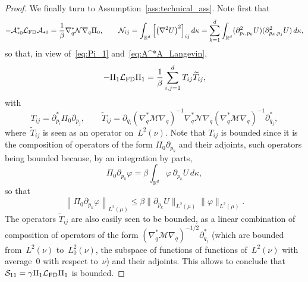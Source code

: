 \documentclass{article}
\newcommand{\cLs}{\mathcal{S}}
\newcommand{\cLa}{\mathcal{A}}
\newcommand{\cLFD}{\mathcal{L}_{\rm FD}}
\newcommand{\R}{\mathbb{R}}
\newcommand{\subplus}{\textnormal{\texttt{+}}}
\renewcommand{\leq}{\leqslant}
\begin{document}
\begin{proof}
We finally turn to Assumption~\ref{ass:technical_ass}. Note first that 
\[
-\cLa_{\subplus 0}^* \cLFD \cLa_{\subplus 0} = \frac{1}{\beta} \nabla_q^* \mathcal{N} \nabla_q \Pi_0, \qquad \mathcal{N}_{ij} = \int_{\R^d} \left[\left(\nabla^2 U\right)^2\right]_{ij} d\kappa = \sum_{k=1}^d \int_{\R^d} (\partial^2_{p_i,p_k} U)(\partial^2_{p_k,p_j} U) \,  d\kappa, 
\]
so that, in view of~\eqref{eq:Pi_1} and~\eqref{eq:A^*A_Langevin},
\[
  -\Pi_1 \cLFD \Pi_1 = \frac{1}{\beta}\sum_{i,j=1}^d T_{ij}\widetilde{T}_{ij},
\]
with
\[
  T_{ij} = \partial_{p_i}^* \Pi_0 \partial_{p_j},
  \qquad
  \widetilde{T}_{ij} = \partial_{q_i} \left(\nabla_q^* \mathcal{M} \nabla_q\right)^{-1}\nabla_q^* \mathcal{N} \nabla_q \left(\nabla_q^* \mathcal{M} \nabla_q\right)^{-1} \partial_{q_j}^*,
  \]
  where~$\widetilde{T}_{ij}$ is seen as an operator on~$L^2(\nu)$. Note that $T_{ij}$ is bounded since it is the composition of operators of the form $\Pi_0 \partial_{p_k}$ and their adjoints, such operators being bounded because, by an integration by parts,  
\[
\Pi_0 \partial_{p_k} \varphi = \beta \int_{\mathbb{R}^d} \varphi \, \partial_{p_k}U \, d\kappa,
\]
so that
\[
\left\| \Pi_0 \partial_{p_k} \varphi \right\|_{L^2(\mu)} \leq \beta\|\partial_{p_k} U\|_{L^2(\mu)}\|\varphi\|_{L^2(\mu)}. 
\]
The operators $\widetilde{T}_{ij}$ are also easily seen to be bounded, as a linear combination of composition of operators of the form $\left(\nabla_q^* \mathcal{M} \nabla_q\right)^{-1/2} \partial_{q_j}^*$ (which are bounded from~$L^2(\nu)$ to~$L^2_0(\nu)$, the subspace of functions of functions of~$L^2(\nu)$ with average~0 with respect to~$\nu$) and their adjoints. This allows to conclude that $\cLs_{11} = \gamma \Pi_1\cLFD \Pi_1$ is bounded. 


\end{proof}
\end{document}
